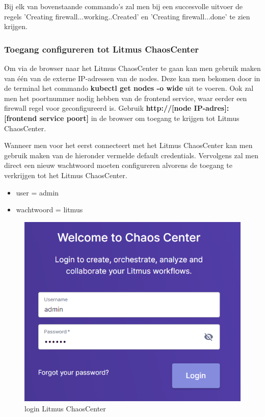 Bij elk van bovenstaande commando's zal men bij een succesvolle uitvoer de regels 'Creating firewall...working..Created' en 'Creating firewall...done' te zien krijgen. 

\subsubsection{Toegang configureren tot Litmus ChaosCenter}
\label{subsec:chaoscenter}

Om via de browser naar het Litmus ChaosCenter te gaan kan men gebruik maken van één van de externe IP-adressen van de nodes. Deze kan men bekomen door in de terminal het commando {\bf kubectl get nodes -o wide} uit te voeren. Ook zal men het poortnummer nodig hebben van de frontend service, waar eerder een firewall regel voor geconfigureerd is. Gebruik {\bf http://[node IP-adres]:[frontend service poort]} in de browser om toegang te krijgen tot Litmus ChaosCenter. 

Wanneer men voor het eerst connecteert met het Litmus ChaosCenter kan men gebruik maken van de hieronder vermelde default credentials. Vervolgens zal men direct een nieuw wachtwoord moeten configureren alvorens de toegang te verkrijgen tot het Litmus ChaosCenter.
\begin{itemize}
    \item user = admin
    \item wachtwoord = litmus
\end{itemize}

\begin{figure}[h]
    \centering
    \includegraphics[scale=.5]{img/chaoscenter-login.png}
    \caption{login Litmus ChaosCenter}
\end{figure}


